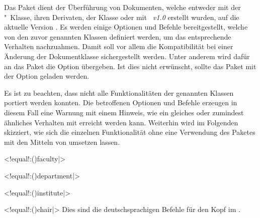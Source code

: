 \begin{DeclareEntity}{}
Das Paket  dient der Überführung von Dokumenten, welche
entweder mit der "~Klasse, ihren Derivaten, 
der Klasse  oder mit \emph{\TUDScript~v1.0} 
erstellt wurden, auf die aktuelle Version \TUDScriptVersion. Es werden einige 
Optionen und Befehle bereitgestellt, welche von den zuvor genannten Klassen 
definiert werden, um das entsprechende Verhalten nachzuahmen. Damit soll vor 
allem die Kompatibilität bei einer Änderung der Dokumentklasse sichergestellt 
werden. Unter anderem wird dafür an das Paket  die Option 
 übergeben. Ist dies nicht erwünscht, sollte das Paket mit der 
Option  geladen werden.
%
\begin{quoting}
\end{quoting}
%
Es ist zu beachten, dass nicht alle Funktionalitäten der genannten Klassen 
portiert werden konnten. Die betroffenen Optionen und Befehle erzeugen in 
diesem Fall eine Warnung mit einem Hinweis, wie ein gleiches oder zumindest 
ähnliches Verhalten mit \TUDScript erreicht werden kann. Weiterhin wird im 
Folgenden skizziert, wie sich die einzelnen Funktionalität ohne eine Verwendung 
des Paketes  mit den Mitteln von \TUDScript umsetzen 
lassen. 

\begin{Declaration}
  {}
  <!equal!:\Macro(){faculty|}>
\begin{Declaration}
  {}
  <!equal!:\Macro(){department|}>
\begin{Declaration}
  {}
  <!equal!:\Macro(){institute|}>
\begin{Declaration}
  {}
  <!equal!:\Macro(){chair|}>
\printdeclarationlist
%
Dies sind die deutschsprachigen Befehle für den Kopf im \CD.
\end{Declaration}
\end{Declaration}
\end{Declaration}
\end{Declaration}


\end{DeclareEntity}
